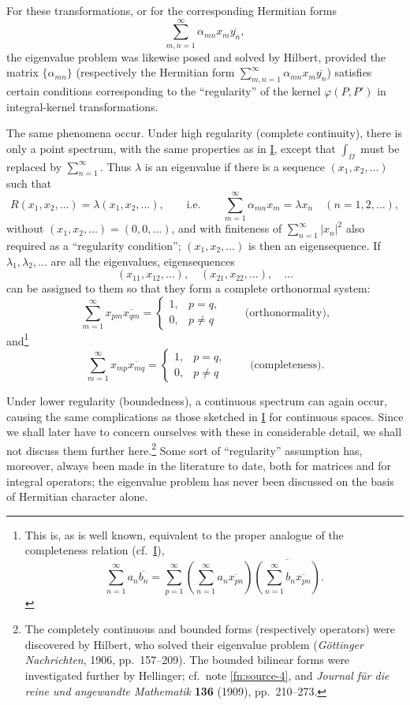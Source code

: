 ﻿\documentclass[paper=b5,fontsize=13pt,bookmarkpackage=false,twoside]{scrartcl}
\begin{document}
For these transformations, or for the corresponding Hermitian forms
\[
 \sum_{m,n=1}^{\infty}\alpha_{mn}x_m\overline{y_n},
\]
the eigenvalue problem was likewise posed and solved by Hilbert, provided the matrix $\{\alpha_{mn}\}$ (respectively the Hermitian form $\sum_{m,n=1}^{\infty}\alpha_{mn}x_m\overline{y_n}$) satisfies certain conditions corresponding to the ``regularity'' of the kernel $\varphi(P,P')$ in integral-kernel transformations.

The same phenomena occur. Under high regularity (complete continuity), there is only a point spectrum, with the same properties as in \hyperref[intro:I]{I}, except that $\int_\Omega$ must be replaced by $\sum_{n=1}^{\infty}$. Thus $\lambda$ is an eigenvalue if there is a sequence $(x_1,x_2,\ldots)$ such that
\[
 R(x_1,x_2,\ldots)=\lambda(x_1,x_2,\ldots),
 \qquad\text{i.e.}\qquad
 \sum_{m=1}^{\infty}\alpha_{mn}x_m=\lambda x_n
 \quad(n=1,2,\ldots),
\]
without $(x_1,x_2,\ldots)=(0,0,\ldots)$, and with finiteness of $\sum_{n=1}^{\infty}|x_n|^2$ also required as a ``regularity condition''; $(x_1,x_2,\ldots)$ is then an eigensequence. If $\lambda_1,\lambda_2,\ldots$ are all the eigenvalues, eigensequences
\[
 (x_{11},x_{12},\ldots),\quad
 (x_{21},x_{22},\ldots),\quad\ldots
\]
can be assigned to them so that they form a complete orthonormal system:
\[
 \sum_{m=1}^{\infty}x_{pm}\overline{x_{qm}}
 =
 \begin{cases}
 1,&p=q,\\
 0,&p\ne q
 \end{cases}
 \qquad\text{(orthonormality),}
\]
and\footnote{\label{fn:source-6}This is, as is well known, equivalent to the proper analogue of the completeness relation (cf.\ \hyperref[intro:I]{I}),
\[
 \sum_{n=1}^{\infty}a_n\overline{b_n}
 =
 \sum_{p=1}^{\infty}
 \left(\sum_{n=1}^{\infty}a_n\overline{x_{pn}}\right)
 \overline{\left(\sum_{n=1}^{\infty}b_n\overline{x_{pn}}\right)}.
\]}
\[
 \sum_{m=1}^{\infty}x_{mp}\overline{x_{mq}}
 =
 \begin{cases}
 1,&p=q,\\
 0,&p\ne q
 \end{cases}
 \qquad\text{(completeness).}
\]

Under lower regularity (boundedness), a continuous spectrum can again occur, causing the same complications as those sketched in \hyperref[intro:I]{I} for continuous spaces. Since we shall later have to concern ourselves with these in considerable detail, we shall not discuss them further here.\footnote{\label{fn:source-7}The completely continuous and bounded forms (respectively operators) were discovered by Hilbert, who solved their eigenvalue problem (\emph{Göttinger Nachrichten}, 1906, pp.~157--209). The bounded bilinear forms were investigated further by Hellinger; cf.\ note \ref{fn:source-4}, and \emph{Journal für die reine und angewandte Mathematik} \textbf{136} (1909), pp.~210--273.} Some sort of ``regularity'' assumption has, moreover, always been made in the literature to date, both for matrices and for integral operators; the eigenvalue problem has never been discussed on the basis of Hermitian character alone.
\end{document}
